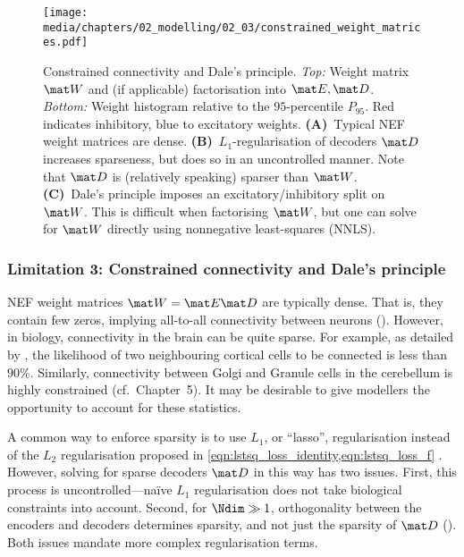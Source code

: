 \begin{figure}
	\texttt{[image: media/chapters/02\_modelling/02\_03/constrained\_weight\_matrices.pdf]}
	{\label{fig:sparsity_and_dales_principle_a}}%
	{\label{fig:sparsity_and_dales_principle_b}}%
	{\label{fig:sparsity_and_dales_principle_c}}%
	\caption[Constrained connectivity and Dale's principle]{Constrained connectivity and Dale's principle. \emph{Top:} Weight matrix $\mat W$ and (if applicable) factorisation into $\mat E, \mat D$. \emph{Bottom:} Weight histogram relative to the $95$-percentile $P_{95}$. Red indicates inhibitory, blue to excitatory weights. \textbf{(A)}~Typical NEF weight matrices are dense.
	\textbf{(B)}~$L_1$-regularisation of decoders $\mat D$ increases sparseness, but does so in an uncontrolled manner. Note that $\mat D$ is (relatively speaking) sparser than $\mat W$.
	\textbf{(C)}~Dale's principle imposes an excitatory/inhibitory split on $\mat W$.
	This is difficult when factorising $\mat W$, but one can solve for $\mat W$ directly using nonnegative least-squares (NNLS).
	}
	\label{fig:sparsity_and_dales_principle}
\end{figure}

\subsubsection{Limitation 3: Constrained connectivity and Dale's principle}
NEF weight matrices $\mat W = \mat E \mat D$ are typically dense.
That is, they contain few zeros, implying all-to-all connectivity between neurons ().
However, in biology, connectivity in the brain can be quite sparse.
For example, as detailed by \citet[Chapter~20]{braitenberg1998cortex}, the likelihood of two neighbouring cortical cells to be connected is less than $90\%$. Similarly, connectivity between Golgi and Granule cells in the cerebellum is highly constrained (cf.~Chapter~5).
It may be desirable to give modellers the opportunity to account for these statistics.

A common way to enforce sparsity is to use $L_1$, or \enquote{lasso}, regularisation instead of the $L_2$ regularisation proposed in \cref{eqn:lstsq_loss_identity,eqn:lstsq_loss_f} \citep[Chapter~6]{boyd2004convex}.
However, solving for sparse decoders $\mat D$ in this way has two issues.
First, this process is uncontrolled---na\"ive $L_1$ regularisation does not take biological constraints into account.
Second, for $\Ndim \gg 1$, orthogonality between the encoders and decoders determines sparsity, and not just the sparsity of $\mat D$ ().
Both issues mandate more complex regularisation terms.

